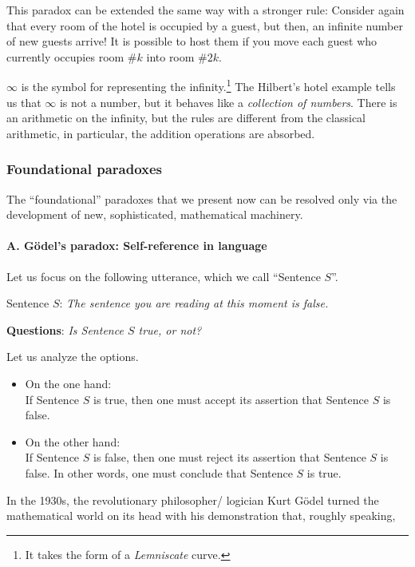 This paradox can be extended the same way with a stronger rule:
Consider again that every room of the hotel is occupied by a
guest, but then, an infinite number of new guests arrive!
It is possible to host them if you move each
guest who currently occupies room \#$k$ into room \#$2k$. 

$\infty$ is the symbol for representing the infinity.\footnote{It takes the form of a \textit{Lemniscate} curve.}
The Hilbert's hotel example tells us that $\infty$ is not a number, but it behaves like a \textit{collection of numbers}.
There is an arithmetic on the infinity, but the rules are different from the classical arithmetic,
in particular, the addition operations are absorbed. 


\subsubsection{Foundational paradoxes}
\label{sec:paradoxes}

The ``foundational'' paradoxes that we present now can be resolved
only via the development of new, sophisticated, mathematical
machinery.

\paragraph{A.  G\"{o}del's paradox: Self-reference in language}

Let us focus on the following utterance, which we call ``Sentence $S$''.

Sentence $S$: {\em The sentence you are reading at this moment is false.}

\noindent
{\bf Questions}: {\it Is Sentence $S$ true, or not?}

\noindent
Let us analyze the options.
\begin{itemize}
\item
On the one hand: \\
If Sentence $S$ is true, then one must accept its assertion that
Sentence $S$ is false.

\item
On the other hand: \\
If Sentence $S$ is false, then one must reject its assertion that
Sentence $S$ is false.  In other words, one must conclude that
Sentence $S$ is true.
\end{itemize}

\noindent
In the 1930s, the revolutionary philosopher/ logician Kurt G\"{o}del
 turned the mathematical world on its head with
his demonstration that, roughly speaking,

